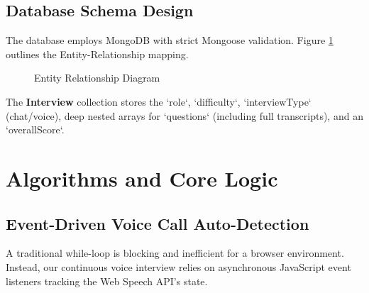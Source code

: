 \documentclass[conference]{IEEEtran}
\begin{document}
\subsection{Database Schema Design}
The database employs MongoDB with strict Mongoose validation. Figure \ref{fig:er} outlines the Entity-Relationship mapping. 

\begin{figure}[htbp]
\centering
{}
\caption{Entity Relationship Diagram}
\label{fig:er}
\end{figure}

The \textbf{Interview} collection stores the `role`, `difficulty`, `interviewType` (chat/voice), deep nested arrays for `questions` (including full transcripts), and an `overallScore`.

\section{Algorithms and Core Logic}

\subsection{Event-Driven Voice Call Auto-Detection}
A traditional while-loop is blocking and inefficient for a browser environment. Instead, our continuous voice interview relies on asynchronous JavaScript event listeners tracking the Web Speech API's state.
\end{document}
